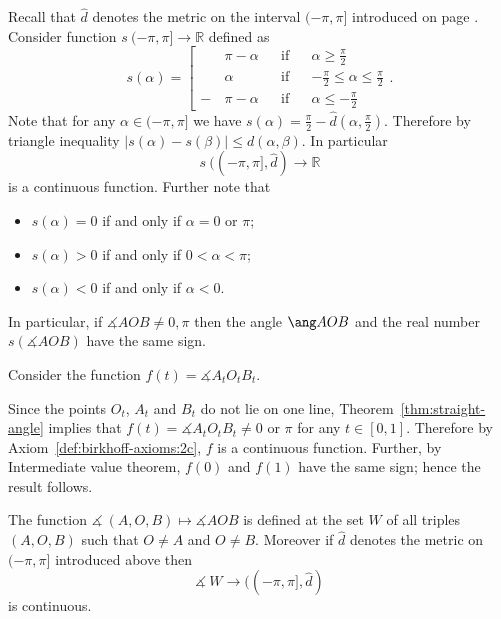 Recall that $\hat d$ denotes the metric on the interval $(-\pi,\pi]$
introduced on page \pageref{def:max-dist}.
Consider function $s\:(-\pi,\pi]\to \mathbb{R}$
defined as 
$$s(\alpha)=\left[
\begin{aligned}
&\pi-\alpha&&\text{if}&&\alpha\ge\tfrac\pi2
\\
&\alpha&&\text{if}&&-\tfrac\pi2\le\alpha\le\tfrac\pi2
\\
-\,&\pi-\alpha&&\text{if}&&\alpha\le-\tfrac\pi2
\end{aligned}
\right.
.$$
Note that for any $\alpha\in (-\pi,\pi]$ we have
$s(\alpha)=\tfrac\pi2-\hat d(\alpha,\tfrac\pi2)$.
Therefore by triangle inequality
$|s(\alpha)-s(\beta)|\le d(\alpha,\beta)$. 
In particular 
$$s\:((-\pi,\pi],\hat{d})\to\mathbb{R}$$ 
is a continuous function.
Further note that
\begin{itemize}
\item $s(\alpha)=0$ if and only if $\alpha=0$ or $\pi$;
\item $s(\alpha)>0$ if and only if $0<\alpha<\pi$;
\item $s(\alpha)<0$ if and only if $\alpha<0$.
\end{itemize}
In particular, if $\measuredangle AOB\ne 0,\pi$ 
then the angle $\ang AOB$ and the real number $s(\measuredangle AOB)$ have the same sign.

Consider the function 
$f(t)=\measuredangle A_tO_tB_t$.

Since 
the points $O_t$, $A_t$ and $B_t$ do not lie on one line,
Theorem~\ref{thm:straight-angle} implies that $f(t)=\measuredangle A_tO_tB_t\ne 0$ or $\pi$ for any $t\in[0,1]$.
Therefore by Axiom~\ref{def:birkhoff-axioms:2c},
$f$ is a continuous function.
Further,
by Intermediate value theorem, $f(0)$ and $f(1)$ have the same sign;
hence the result follows.
\qeds








\item\label{def:birkhoff-axioms:2c} 
The function $\measuredangle\:(A,O,B)\mapsto\measuredangle A O B$
is defined at the set $W$ of all triples 
$(A,O,B)$ such that $O\ne A$ and $O\ne B$.
Moreover if $\hat{d}$ denotes the metric on $(-\pi,\pi]$ introduced above then
$$\measuredangle\: W\to ((-\pi,\pi],\hat{d})$$ 
is continuous.









